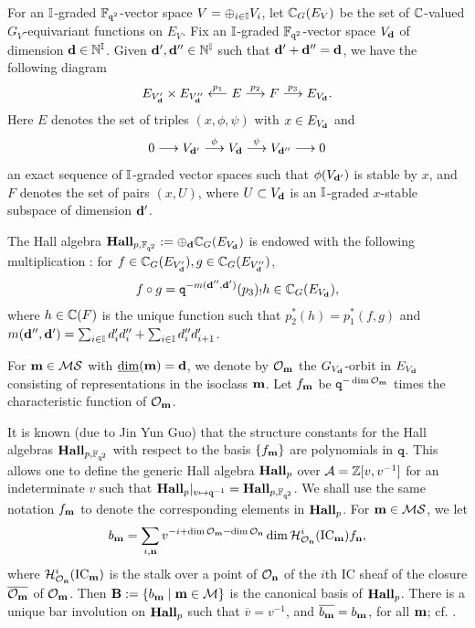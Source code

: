 For an $\mathbb{I}$-graded $\mathbb{F}_{\texttt{q}^2}$-vector space $V=\oplus_{i\in\mathbb{I}} V_i$, let $\mathbb{C}_G(E_V)$ be the set of $\mathbb{C}$-valued $G_V$-equivariant functions on $E_V$. Fix an $\mathbb{I}$-graded $\mathbb{F}_{\texttt{q}^2}$-vector space $V_{\mathbf{d}}$ of dimension $\mathbf{d} \in \mathbb{N}^{\mathbb{I}}$. Given $\mathbf{d}', \mathbf{d}'' \in \mathbb{N}^{\mathbb{I}}$ such that $\mathbf{d}'+\mathbf{d}''=\mathbf{d}$, we have the following diagram
\[
E_{V_{\mathbf{d}}'} \times E_{V_{\mathbf{d}}''} \stackrel{p_1}{\longleftarrow} E \stackrel{p_2}{\longrightarrow} F \stackrel{p_3}{\longrightarrow} E_{V_{\mathbf{d}}}.
\]
Here $E$ denotes the set of triples $(x,\phi,\psi)$ with $x\in E_{V_{\mathbf{d}}}$ and
\[
0\longrightarrow V_{\mathbf{d}'} \stackrel{\phi}{\longrightarrow} V_{\mathbf{d}} \stackrel{\psi}{\longrightarrow} V_{\mathbf{d}''} \longrightarrow 0
\]
an exact sequence of $\mathbb{I}$-graded vector spaces such that $\phi(V_{\mathbf{d}'})$ is stable by $x$, and $F$ denotes the set of pairs $(x,U)$, where $U\subset V_{\mathbf{d}}$ is an $\mathbb{I}$-graded $x$-stable subspace of dimension $\mathbf{d}'$. 

The Hall algebra $\bold{Hall}_{p,\mathbb{F}_{\texttt{q}^2}} :=\oplus_{\mathbf{d}} \mathbb{C}_G(E_{V_{\mathbf{d}}})$ is endowed with the following multiplication \cite{Lus91, Lus98}: for $f \in \mathbb{C}_G(E_{V'_{\mathbf{d}}}), g\in \mathbb{C}_G(E_{V''_{\mathbf{d}}})$,
\begin{align}
    \label{product}
    f \circ g =\texttt{q}^{-m(\mathbf{d}'',\mathbf{d}')} (p_3)_! h \in \mathbb{C}_G(E_{V_{\mathbf{d}}}),
\end{align}
where $h \in \mathbb{C}(F)$ is the unique function such that $p_2^*(h) =p_1^*(f,g)$ and $m(\mathbf{d}'',\mathbf{d}')= \sum_{i\in\mathbb{I}} d_i'd_i'' +\sum_{i\in \mathbb{I}} d_i''d_{i+1}'$. 

For $\mathbf{m} \in \mathcal{M}\mathcal{S}$ with $\underline{\dim} (\mathbf{m}) =\mathbf{d}$, we denote by $\mathcal{O}_{\mathbf{m}}$ the $G_{V_{\mathbf{d}}}$-orbit in $E_{V_{\mathbf{d}}}$ consisting of representations in the isoclass $\mathbf{m}$. Let $f_{\mathbf{m}}$ be $\texttt{q}^{-\dim \mathcal{O}_{\mathbf{m}}}$ times the characteristic function of $\mathcal{O}_{\mathbf{m}}$.

It is known (due to Jin Yun Guo) that the structure constants for the Hall algebras $\bold{Hall}_{p,\mathbb{F}_{\texttt{q}^2}}$ with respect to the basis $\{f_{\mathbf{m}}\}$ are polynomials in $\texttt{q}$. This allows one to define the generic Hall algebra $\bold{Hall}_{p}$ over $\mathcal{A}=\mathbb{Z}[v,v^{-1}]$ for an indeterminate $v$ such that $\bold{Hall}_{p}|_{v\mapsto \texttt{q}^{-1}} =\bold{Hall}_{p,\mathbb{F}_{\texttt{q}^2}}$. We shall use the same notation $f_{\mathbf{m}}$ to denote the corresponding elements in $\bold{Hall}_{p}$. For $\mathbf{m} \in \mathcal{M}\mathcal{S}$, we let
\begin{align*}
    b_{\mathbf{m}} =\sum_{i, \mathbf{n}} v^{-i+\dim \mathcal{O}_{\mathbf{m}} -\dim \mathcal{O}_{\mathbf{n}}} \dim \mathcal{H}^i_{\mathcal{O}_{\mathbf{n}}} (\text{IC}_{\mathbf{m}})f_{\mathbf{n}},
\end{align*}
where $\mathcal{H}^i_{\mathcal{O}_{\mathbf{n}}} (\text{IC}_{\mathbf{m}})$ is the stalk over a point of $\mathcal{O}_{\mathbf{n}}$ of the $i$th IC sheaf of the closure $\overline{\mathcal{O}_{\mathbf{m}}}$ of $\mathcal{O}_{\mathbf{m}}$. Then $\mathbf{B} :=\{b_{\mathbf{m}}\mid \mathbf{m} \in \mathcal{M}\}$ is the canonical basis of $\bold{Hall}_{p}$. There is a unique bar involution on $\bold{Hall}_{p}$ such that $\overline{v}=v^{-1}$, and $\overline{b_{\mathbf{m}}}=b_{\mathbf{m}}$, for all $\mathbf{m}$; cf. \cite{Lus98, VV99}. 

